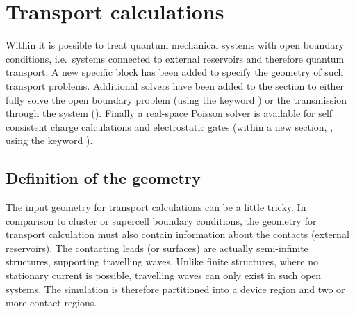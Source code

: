 \chapter{Transport calculations}
\label{app:transp}

Within {\dftbp} it is possible to treat quantum mechanical
systems with open boundary conditions, i.e.\ systems connected to external
reservoirs and therefore quantum transport.  A new specific 
block has been added to specify the geometry of such transport problems.
Additional solvers have been added to the  section to either
fully solve the open boundary problem (using the keyword )
or the transmission through the system (). Finally a
real-space Poisson solver is available for self consistent charge calculations
and electrostatic gates (within a new section, , using the
keyword ).

\section{Definition of the geometry}
\label{sec:transport.geometry}

The input geometry for transport calculations can be a little tricky. In
comparison to cluster or supercell boundary conditions, the geometry for
transport calculation must also contain information about the contacts (external
reservoirs). The contacting leads (or surfaces) are actually semi-infinite
structures, supporting travelling waves. Unlike finite structures, where no
stationary current is possible, travelling waves can only exist in such open
systems.  The simulation is therefore partitioned into a device region and two
or more contact regions.

